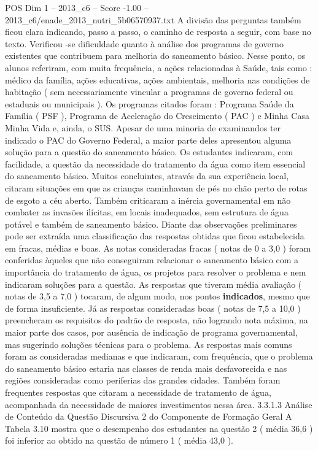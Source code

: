 \begin{textsample}{POS Dim 1 – 2013\_c6 – Score -1.00 – 2013\_c6/enade\_2013\_nutri\_5b06570937.txt}
A divisão das perguntas também ficou clara indicando, passo a passo, o caminho de resposta a seguir, com base no texto.
Verificou -se dificuldade quanto à análise dos programas de governo existentes que contribuem para melhoria do saneamento básico.
Nesse ponto, os alunos referiram, com muita frequência, a ações relacionadas à Saúde, tais como : médico da família, ações educativas, ações ambientais, melhoria nas condições de habitação ( sem necessariamente vincular a programas de governo federal ou estaduais ou municipais ).
Os programas citados foram : Programa Saúde da Família ( PSF ), Programa de Aceleração do Crescimento ( PAC ) e Minha Casa Minha Vida e, ainda, o SUS.
Apesar de uma minoria de examinandos ter indicado o PAC do Governo Federal, a maior parte deles apresentou alguma solução para a questão do saneamento básico.
Os estudantes indicaram, com facilidade, a questão da necessidade do tratamento da água como item essencial do saneamento básico.
Muitos concluintes, através da sua experiência local, citaram situações em que as crianças caminhavam de pés no chão perto de rotas de esgoto a céu aberto.
Também criticaram a inércia governamental em não combater as invasões ilícitas, em locais inadequados, sem estrutura de água potável e também de saneamento básico.
Diante das observações preliminares pode ser extraída uma classificação das respostas obtidas que ficou estabelecida em fracas, médias e boas.
As notas consideradas fracas ( notas de 0 a 3,0 ) foram conferidas àqueles que não conseguiram relacionar o saneamento básico com a importância do tratamento de água, os projetos para resolver o problema e nem indicaram soluções para a questão.
As respostas que tiveram média avaliação ( notas de 3,5 a 7,0 ) tocaram, de algum modo, nos pontos \textbf{indicados}, mesmo que de forma insuficiente.
Já as respostas consideradas boas ( notas de 7,5 a 10,0 ) preencheram os requisitos do padrão de resposta, não logrando nota máxima, na maior parte dos casos, por ausência de indicação de programa governamental, mas sugerindo soluções técnicas para o problema.
As respostas mais comuns foram as consideradas medianas e que indicaram, com frequência, que o problema do saneamento básico estaria nas classes de renda mais desfavorecida e nas regiões consideradas como periferias das grandes cidades.
Também foram frequentes respostas que citaram a necessidade de tratamento de água, acompanhada da necessidade de maiores investimentos nessa área. 3.3.1.3 Análise de Conteúdo da Questão Discursiva 2 do Componente de Formação Geral A Tabela 3.10 mostra que o desempenho dos estudantes na questão 2 ( média 36,6 ) foi inferior ao obtido na questão de número 1 ( média 43,0 ).

\end{textsample}
